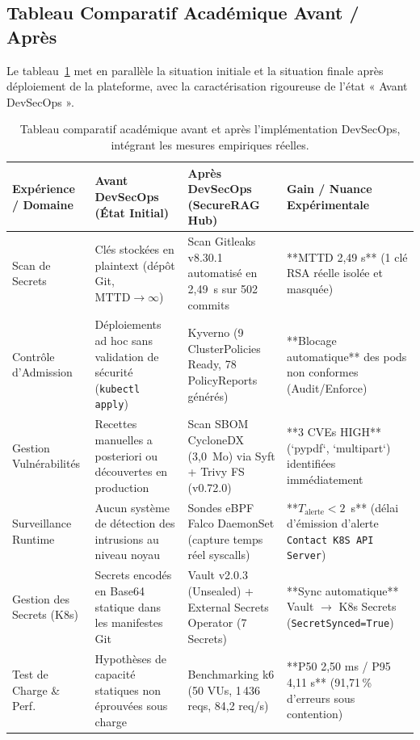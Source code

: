 \subsection{Tableau Comparatif Académique Avant / Après}

Le tableau~\ref{tab:comparaison_avant_apres_full_sec} met en parallèle la situation initiale et la situation finale après déploiement de la plateforme, avec la caractérisation rigoureuse de l'état « Avant DevSecOps ».

\begin{table}[H]
\centering
\scriptsize
\begin{tabular}{@{}p{2.8cm}p{4.2cm}p{4.8cm}p{2.2cm}@{}}
\toprule
\textbf{Expérience / Domaine} & \textbf{Avant DevSecOps (État Initial)} & \textbf{Après DevSecOps (SecureRAG Hub)} & \textbf{Gain / Nuance Expérimentale} \\
\midrule
Scan de Secrets & Clés stockées en plaintext (dépôt Git, $\text{MTTD} \rightarrow \infty$) & Scan Gitleaks v8.30.1 automatisé en 2,49~s sur 502 commits & **MTTD 2,49 s** (1 clé RSA réelle isolée et masquée) \\
Contrôle d'Admission & Déploiements ad hoc sans validation de sécurité (\texttt{kubectl apply}) & Kyverno (9 ClusterPolicies Ready, 78 PolicyReports générés) & **Blocage automatique** des pods non conformes (Audit/Enforce) \\
Gestion Vulnérabilités & Recettes manuelles a posteriori ou découvertes en production & Scan SBOM CycloneDX (3,0~Mo) via Syft + Trivy FS (v0.72.0) & **3 CVEs HIGH** (`pypdf`, `multipart`) identifiées immédiatement \\
Surveillance Runtime & Aucun système de détection des intrusions au niveau noyau & Sondes eBPF Falco DaemonSet (capture temps réel syscalls) & **$T_{\text{alerte}} < 2$~s** (délai d'émission d'alerte \texttt{Contact K8S API Server}) \\
Gestion des Secrets (K8s) & Secrets encodés en Base64 statique dans les manifestes Git & Vault v2.0.3 (Unsealed) + External Secrets Operator (7 Secrets) & **Sync automatique** Vault $\rightarrow$ K8s Secrets (\texttt{SecretSynced=True}) \\
Test de Charge \& Perf. & Hypothèses de capacité statiques non éprouvées sous charge & Benchmarking k6 (50 VUs, 1\,436 reqs, 84,2 req/s) & **P50 2,50 ms / P95 4,11 s** (91,71\,\% d'erreurs sous contention) \\
\bottomrule
\end{tabular}
\caption{Tableau comparatif académique avant et après l'implémentation DevSecOps, intégrant les mesures empiriques réelles.}
\label{tab:comparaison_avant_apres_full_sec}
\end{table}



